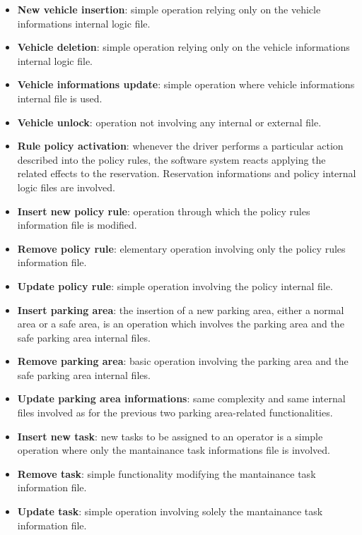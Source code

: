 \begin{itemize}
	\item \textbf{New vehicle insertion}: simple operation relying only on the vehicle informations internal logic file.

	\item \textbf{Vehicle deletion}: simple operation relying only on the vehicle informations internal logic file.

	\item \textbf{Vehicle informations update}: simple operation where vehicle informations internal file is used.

	\item \textbf{Vehicle unlock}: operation not involving any internal or external file.

	\item \textbf{Rule policy activation}: whenever the driver performs a particular action described into the policy rules, the software system reacts applying the related effects to the reservation. Reservation informations and policy internal logic files are involved.

	\item \textbf{Insert new policy rule}: operation through which the policy rules information file is modified.

	\item \textbf{Remove policy rule}: elementary operation involving only the policy rules information file.

	\item \textbf{Update policy rule}: simple operation involving the policy internal file.

	\item \textbf{Insert parking area}: the insertion of a new parking area, either a normal area or a safe area, is an operation which involves the parking area and the safe parking area internal files.

	\item \textbf{Remove parking area}: basic operation involving the parking area and the safe parking area internal files.

	\item \textbf{Update parking area informations}: same complexity and same internal files involved as for the previous two parking area-related functionalities.

	\item \textbf{Insert new task}: new tasks to be assigned to an operator is a simple operation where only the mantainance task informations file is involved.

	\item \textbf{Remove task}: simple functionality modifying the mantainance task information file.

	\item \textbf{Update task}: simple operation involving solely the mantainance task information file.
\end{itemize}

